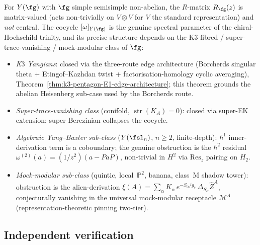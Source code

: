\begin{remark}
\label{rem:heisenberg-pentagon-yangian-open}
For $Y(\fg)$ with $\fg$ simple semisimple non-abelian, the
$R$-matrix $R_{\fg}(z)$ is matrix-valued (acts non-trivially on
$V \otimes V$ for $V$ the standard representation) and \emph{not}
central. The cocycle $[\omega]_{Y(\fg)}$ is the genuine spectral
parameter of the chiral-Hochschild trinity, and its precise structure
depends on the K$3$-fibred / super-trace-vanishing / mock-modular
class of $\fg$:
\begin{itemize}
\item \emph{K$3$ Yangians}: closed via the three-route edge
 architecture (Borcherds singular theta + Etingof--Kazhdan twist
 + factorisation-homology cyclic averaging),
 Theorem~\ref{thm:k3-pentagon-E1-edge-architecture}; this
 theorem grounds the abelian Heisenberg sub-case used by the
 Borcherds route.
\item \emph{Super-trace-vanishing class} \textup{(}conifold,
 $\operatorname{str}(K_A) = 0$\textup{):} closed via super-EK
 extension; super-Berezinian collapses the cocycle.
\item \emph{Algebraic Yang--Baxter sub-class}
 \textup{(}$Y(\fsl_n)$, $n \geq 2$, finite-depth\textup{):}
 $\hbar^1$ inner-derivation term is a coboundary; the genuine
 obstruction is the $\hbar^2$ residual
 $\omega^{(2)}(a) = (1/z^2)(a - PaP)$, non-trivial in $H^2$ via
 $\mathrm{Res}_z$ pairing on $H_2$.
\item \emph{Mock-modular sub-class}
 \textup{(}quintic, local~$\mathbb{P}^2$, banana, class~M shadow
 tower\textup{):} obstruction is the alien-derivation
 $\xi(A) = \sum_\alpha K_\alpha\, e^{-S_\alpha/g_s}\,
 \Delta_{S_\alpha} \widehat{Z}^A$, conjecturally vanishing in
 the universal mock-modular receptacle $\mathcal{M}^A$
 \textup{(}representation-theoretic pinning two-tier\textup{).}
\end{itemize}
\end{remark}

\subsection{Independent verification}
\label{subsec:heisenberg-pentagon-IV}

